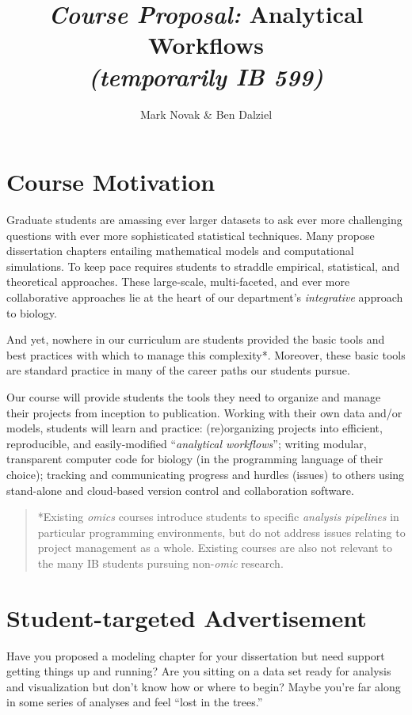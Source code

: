 \documentclass[10pt]{article}
\author{Mark Novak \& Ben Dalziel}
\title{\emph{Course Proposal:}  Analytical Workflows\\\emph{\small{(temporarily} IB 599)}}
\date{}
\begin{document}
\maketitle

\section*{Course Motivation}
Graduate students are amassing ever larger datasets to ask ever more challenging questions with ever more sophisticated  statistical techniques. Many propose dissertation chapters entailing mathematical models and computational simulations. To keep pace requires students to straddle empirical, statistical, and theoretical approaches. These large-scale, multi-faceted, and ever more collaborative approaches lie at the heart of our department's \emph{integrative} approach to biology.  

And yet, nowhere in our curriculum are students provided the basic tools and best practices with which to manage this complexity*. Moreover, these basic tools are standard practice in many of the career paths our students pursue.

Our course will provide students the tools they need to organize and manage their projects from inception to publication.  Working with their own data and/or models, students will learn and practice: (re)organizing projects into efficient, reproducible, and easily-modified ``\emph{analytical workflows}''; writing modular, transparent computer code for biology (in the programming language of their choice); tracking and communicating progress and hurdles (issues) to others using stand-alone and cloud-based version control and collaboration software.

\begin{quote}
	*Existing \emph{omics} courses introduce students to specific \emph{analysis pipelines} in particular programming environments, but do not address issues relating to project management as a whole. Existing courses are also not relevant to the many IB students pursuing non-\emph{omic} research.
\end{quote}


\section*{Student-targeted Advertisement}
Have you proposed a modeling chapter for your dissertation but need support getting things up and running?  Are you sitting on a data set ready for analysis and visualization but don't know how or where to begin?  Maybe you're far along in some series of analyses and feel ``lost in the trees.''
\end{document}
